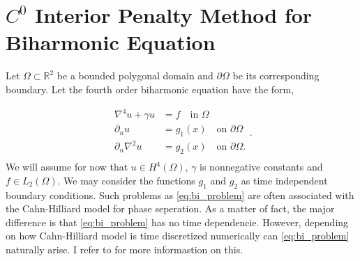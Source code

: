 \newpage
\section{ $C^0$ Interior Penalty Method for Biharmonic Equation}
\label{sec:ch1}



Let $\Omega \subset   \mathbb{R} ^2$ be a bounded polygonal domain and $\partial \Omega $ be its corresponding boundary. Let the fourth order biharmonic equation have the form,

\begin{equation}
\label{eq:bi_problem}
\begin{split}
    \nabla ^4 u  + \gamma u  & = f \quad \text{in } \Omega   \\
    \partial _{n} u & = g_1\left( x \right)  \quad \text{on } \partial \Omega  \\
    \partial _{n} \nabla ^2 u & = g_{2}\left( x \right)  \quad \text{on } \partial \Omega .  \\
\end{split}
.\end{equation}
We will assume for now that $u \in H^{4}\left( \Omega  \right) $, $\gamma $ is nonnegative constants and $f \in L_{2}\left( \Omega  \right) $. We may consider the functions $g_{1}$ and $g_{2}$ as time independent boundary conditions. Such problems as \eqref{eq:bi_problem} are often associated with the Cahn-Hilliard model
\cite{cahnhilliard1957} for phase seperation. As a matter of fact, the major difference is that \eqref{eq:bi_problem}
has no time dependencie. However, depending on how Cahn-Hilliard model is time discretized numerically can
\eqref{eq:bi_problem} naturally arise. I refer to \cite{brenner2012quadratic} for more informastion on this.

